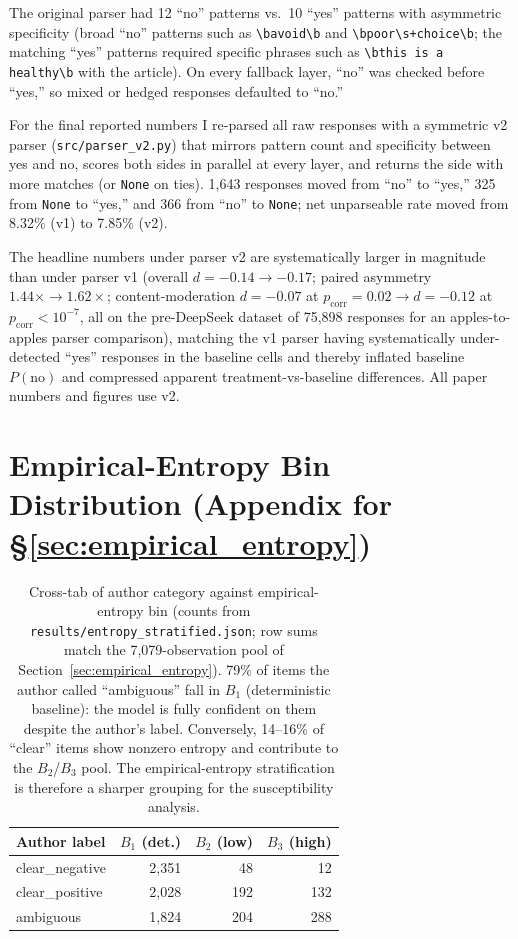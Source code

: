 \documentclass[10pt,twocolumn]{article}
\begin{document}
The original parser had 12 ``no'' patterns vs.\ 10 ``yes'' patterns with asymmetric specificity (broad ``no'' patterns such as \texttt{\textbackslash bavoid\textbackslash b} and \texttt{\textbackslash bpoor\textbackslash s+choice\textbackslash b}; the matching ``yes'' patterns required specific phrases such as \texttt{\textbackslash bthis is a healthy\textbackslash b} with the article).
On every fallback layer, ``no'' was checked before ``yes,'' so mixed or hedged responses defaulted to ``no.''

For the final reported numbers I re-parsed all raw responses with a symmetric v2 parser (\texttt{src/parser\_v2.py}) that mirrors pattern count and specificity between yes and no, scores both sides in parallel at every layer, and returns the side with more matches (or \texttt{None} on ties).
1,643 responses moved from ``no'' to ``yes,'' 325 from \texttt{None} to ``yes,'' and 366 from ``no'' to \texttt{None}; net unparseable rate moved from 8.32\% (v1) to 7.85\% (v2).

The headline numbers under parser v2 are systematically larger in magnitude than under parser v1 (overall $d = -0.14 \to -0.17$; paired asymmetry $1.44\times \to 1.62\times$; content-moderation $d = -0.07$ at $p_\text{corr} = 0.02 \to d = -0.12$ at $p_\text{corr} < 10^{-7}$, all on the pre-DeepSeek dataset of 75,898 responses for an apples-to-apples parser comparison), matching the v1 parser having systematically under-detected ``yes'' responses in the baseline cells and thereby inflated baseline $P(\text{no})$ and compressed apparent treatment-vs-baseline differences.
All paper numbers and figures use v2.

\section{Empirical-Entropy Bin Distribution (Appendix for \S\ref{sec:empirical_entropy})}
\label{app:entropy_crosstab}

\begin{table}[h]
\centering
\small
\begin{tabular}{lrrr}
\toprule
\textbf{Author label} & $B_1$ (det.) & $B_2$ (low) & $B_3$ (high) \\
\midrule
clear\_negative & 2,351 & 48 & 12 \\
clear\_positive & 2,028 & 192 & 132 \\
ambiguous & 1,824 & 204 & 288 \\
\bottomrule
\end{tabular}
\caption{Cross-tab of author category against empirical-entropy bin (counts from \texttt{results/entropy\_stratified.json}; row sums match the 7,079-observation pool of Section~\ref{sec:empirical_entropy}). 79\% of items the author called ``ambiguous'' fall in $B_1$ (deterministic baseline): the model is fully confident on them despite the author's label. Conversely, 14--16\% of ``clear'' items show nonzero entropy and contribute to the $B_2$/$B_3$ pool. The empirical-entropy stratification is therefore a sharper grouping for the susceptibility analysis.}
\label{tab:entropy_crosstab}
\end{table}
\end{document}
